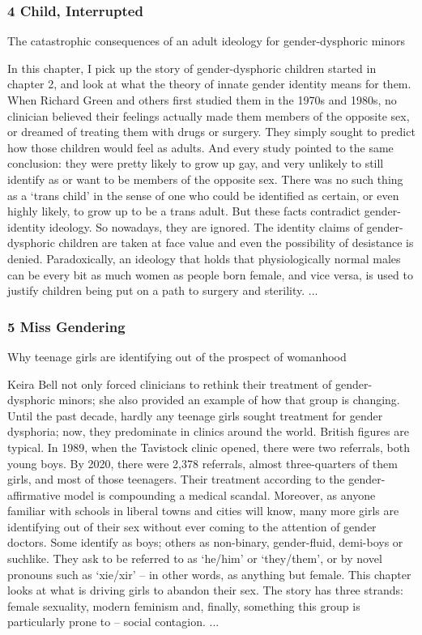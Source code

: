 \documentclass[10pt,titlepage]{book}
\begin{document}
\subsubsection{4 Child, Interrupted}

The catastrophic consequences of an adult ideology for gender-dysphoric minors

In this chapter, I pick up the story of gender-dysphoric children started in chapter 2, and look at what the theory of innate gender identity means for them. When Richard Green and others first studied them in the 1970s and 1980s, no clinician believed their feelings actually made them members of the opposite sex, or dreamed of treating them with drugs or surgery. They simply sought to predict how those children would feel as adults. And every study pointed to the same conclusion: they were pretty likely to grow up gay, and very unlikely to still identify as or want to be members of the opposite sex. There was no such thing as a ‘trans child’ in the sense of one who could be identified as certain, or even highly likely, to grow up to be a trans adult. But these facts contradict gender-identity ideology. So nowadays, they are ignored. The identity claims of gender-dysphoric children are taken at face value and even the possibility of desistance is denied. Paradoxically, an ideology that holds that physiologically normal males can be every bit as much women as people born female, and vice versa, is used to justify children being put on a path to surgery and sterility.
...

\subsubsection{5 Miss Gendering}

Why teenage girls are identifying out of the prospect of womanhood

Keira Bell not only forced clinicians to rethink their treatment of gender-dysphoric minors; she also provided an example of how that group is changing. Until the past decade, hardly any teenage girls sought treatment for gender dysphoria; now, they predominate in clinics around the world. British figures are typical. In 1989, when the Tavistock clinic opened, there were two referrals, both young boys. By 2020, there were 2,378 referrals, almost three-quarters of them girls, and most of those teenagers. Their treatment according to the gender-affirmative model is compounding a medical scandal. Moreover, as anyone familiar with schools in liberal towns and cities will know, many more girls are identifying out of their sex without ever coming to the attention of gender doctors. Some identify as boys; others as non-binary, gender-fluid, demi-boys or suchlike. They ask to be referred to as ‘he/him’ or ‘they/them’, or by novel pronouns such as ‘xie/xir’ – in other words, as anything but female. This chapter looks at what is driving girls to abandon their sex. The story has three strands: female sexuality, modern feminism and, finally, something this group is particularly prone to – social contagion.
...
\end{document}
